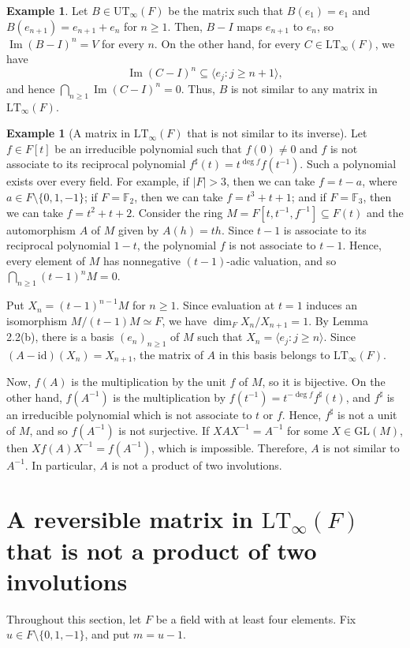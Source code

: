 \documentclass[11pt,reqno,a4paper]{amsart}
\numberwithin{equation}{section}
\theoremstyle{definition}
\newtheorem{example}[theorem]{Example}
\theoremstyle{plain}
\newcommand{\GL}{\mathrm{GL}}
\newcommand{\Imop}{\operatorname{Im}}
\newcommand{\id}{\mathrm{id}}
\newcommand{\LT}{\mathrm{LT}_{\infty}}
\newcommand{\UT}{\mathrm{UT}_{\infty}}
\newcommand{\bbF}{\mathbb F}
\newcommand{\spann}[1]{\langle #1\rangle}
\begin{document}
\begin{example}
Let $B\in\UT(F)$ be the matrix such that $B(e_1)=e_1$ and $B(e_{n+1})=e_{n+1}+e_n$ for $n\ge1$. Then, $B-I$ maps $e_{n+1}$ to $e_n$, so $\Imop(B-I)^n=V$ for every $n$. On the other hand, for every $C\in\LT(F)$, we have
\[
\Imop(C-I)^n\subseteq\spann{e_j:j\ge n+1},
\]
and hence $\bigcap_{n\ge1}\Imop(C-I)^n=0$. Thus, $B$ is not similar to any matrix in $\LT(F)$.
\end{example}

\begin{example}[A matrix in $\LT(F)$ that is not similar to its inverse]
Let $f\in F[t]$ be an irreducible polynomial such that $f(0)\ne0$ and $f$ is not associate to its reciprocal polynomial $f^{\sharp}(t)=t^{\deg f}f(t^{-1})$. Such a polynomial exists over every field. For example, if $|F|>3$, then we can take $f=t-a$, where $a\in F\setminus\{0,1,-1\}$; if $F=\bbF_2$, then we can take $f=t^3+t+1$; and if $F=\bbF_3$, then we can take $f=t^2+t+2$. Consider the ring $M=F[t,t^{-1},f^{-1}]\subseteq F(t)$ and the automorphism $A$ of $M$ given by $A(h)=th$. Since $t-1$ is associate to its reciprocal polynomial $1-t$, the polynomial $f$ is not associate to $t-1$. Hence, every element of $M$ has nonnegative $(t-1)$-adic valuation, and so $\bigcap_{n\ge1}(t-1)^nM=0$.

Put $X_n=(t-1)^{n-1}M$ for $n\ge1$. Since evaluation at $t=1$ induces an isomorphism $M/(t-1)M\simeq F$, we have $\dim_F X_n/X_{n+1}=1$. By Lemma 2.2(b), there is a basis $(e_n)_{n\ge1}$ of $M$ such that $X_n=\spann{e_j:j\ge n}$. Since $(A-\id)(X_n)=X_{n+1}$, the matrix of $A$ in this basis belongs to $\LT(F)$.

Now, $f(A)$ is the multiplication by the unit $f$ of $M$, so it is bijective. On the other hand, $f(A^{-1})$ is the multiplication by $f(t^{-1})=t^{-\deg f}f^{\sharp}(t)$, and $f^{\sharp}$ is an irreducible polynomial which is not associate to $t$ or $f$. Hence, $f^{\sharp}$ is not a unit of $M$, and so $f(A^{-1})$ is not surjective. If $XAX^{-1}=A^{-1}$ for some $X\in\GL(M)$, then $Xf(A)X^{-1}=f(A^{-1})$, which is impossible. Therefore, $A$ is not similar to $A^{-1}$. In particular, $A$ is not a product of two involutions.
\end{example}

\section{A reversible matrix in \texorpdfstring{$\LT(F)$}{LT-infinity(F)} that is not a product of two involutions}
Throughout this section, let $F$ be a field with at least four elements. Fix $u\in F\setminus\{0,1,-1\}$, and put $m=u-1$.
\end{document}
